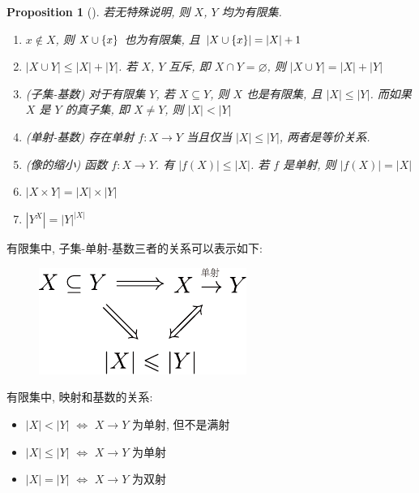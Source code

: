 \documentclass[UTF8]{ctexart}
\theoremstyle{mystyle}
\newtheorem{proposition}{Proposition}[section]
\theoremstyle{myremark}
\theoremstyle{plain}
\DeclarePairedDelimiter\set{\{}{\}}
\begin{document}
\begin{proposition}[] \label{cardinal}
    若无特殊说明, 则 $ X $, $ Y $ 均为有限集.
    \begin{enumerate}
        \item $ x \notin X $, 则 $ X \cup \set{x} $ 也为有限集, 且 $ |X \cup \set{x}| = |X| + 1 $
        \item $ |X \cup Y| \leqslant |X| + |Y| $. 若 $ X $, $ Y $ 互斥, 即 $ X \cap Y = \varnothing $, 则 $ |X \cup Y| = |X| + |Y| $
        \item (子集-基数) 对于有限集 $ Y $, 若 $ X \subseteq Y $, 则 $ X $ 也是有限集, 且 $ |X| \leqslant |Y| $. 而如果 $ X $ 是 $ Y $ 的真子集, 即 $ X \neq Y $, 则 $ |X| < |Y| $
        \item (单射-基数) 存在单射 $ f\colon X \to Y $ 当且仅当 $ |X| \leqslant |Y| $, 两者是等价关系.
        \item (像的缩小) 函数 $ f \colon X \to Y $. 有 $ |f(X)| \leqslant |X| $. 若 $ f $ 是单射, 则 $ |f(X)| = |X| $
        \item $ |X \times Y| = |X| \times |Y| $
        \item $ |Y^X| = |Y|^{|X|} $
    \end{enumerate}
\end{proposition}

有限集中, 子集-单射-基数三者的关系可以表示如下:
\begin{figure}[H]
    \centering
    \includegraphics[width = 0.35\linewidth]{./images/implies.pdf}
\end{figure}

有限集中, 映射和基数的关系:
\begin{itemize}
    \item $ |X| < |Y| $ $ \Longleftrightarrow $ $ X \to Y $ 为单射, 但不是满射
    \item $ |X| \leqslant |Y| $ $ \Longleftrightarrow $ $ X \to Y $ 为单射
    \item $ |X| = |Y| $ $ \Longleftrightarrow $ $ X \to Y $ 为双射
\end{itemize}
\end{document}
